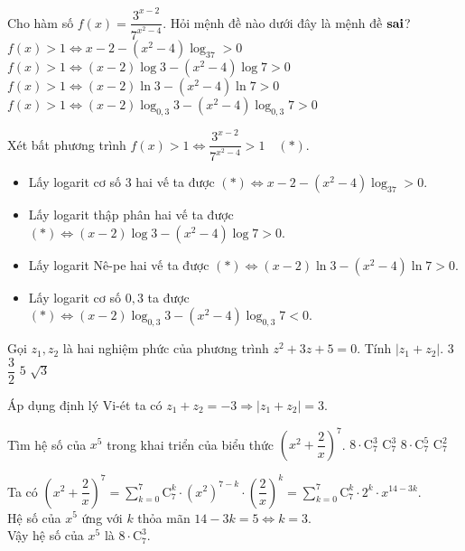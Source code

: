 \begin{ex}%
	Cho hàm số $f(x)=\dfrac{3^{x-2}}{7^{x^2-4}}$. Hỏi mệnh đề nào dưới đây là mệnh đề $\bf{sai}$?
	\choice
	{$f(x)>1 \Leftrightarrow x-2 -(x^2-4) \log_37>0$}
	{$f(x)>1 \Leftrightarrow (x-2)\log3-(x^2-4)\log7 >0$}
	{$f(x)>1 \Leftrightarrow (x-2)\ln 3 -(x^2-4)\ln 7 >0$}
	{\True $f(x)>1 \Leftrightarrow (x-2)\log_{0{,}3}3-(x^2-4)\log_{0{,}3}7>0$}
	\loigiai
	{ Xét bất phương trình $f(x)>1 \Leftrightarrow \dfrac{3^{x-2}}{7^{x^2-4}}>1 \quad (*).$ 
	\begin{itemize}
		\item  Lấy logarit cơ số 3 hai vế ta được  $ (*) \Leftrightarrow x-2 -(x^2-4) \log_37>0.$
		\item Lấy logarit thập phân hai vế ta được $(*) \Leftrightarrow (x-2)\log3-(x^2-4)\log7 >0$.
		\item Lấy logarit Nê-pe hai vế ta được $(*) \Leftrightarrow (x-2)\ln 3 -(x^2-4)\ln 7 >0$.
		\item  Lấy logarit cơ số $0{,}3$ ta được $(*) \Leftrightarrow (x-2)\log_{0{,}3}3-(x^2-4)\log_{0{,}3}7<0 $.
	\end{itemize}
		
	}
\end{ex}

\begin{ex}%
	Gọi $z_1, z_2$ là hai nghiệm phức của phương trình $z^2+3z+5=0$. Tính $|z_1+z_2|$.
	\choice
	{\True $ 3$}
	{$\dfrac{3}{2}$}
	{$5$}
	{$\sqrt{3}$}
	\loigiai
	{ Áp dụng định lý Vi-ét ta có $z_1+z_2=-3 \Rightarrow |z_1+z_2|=3.$
		
	}
	
\end{ex}

\begin{ex}%
	Tìm hệ số của $x^5$ trong khai triển của biểu thức $\left( x^2+\dfrac{2}{x}\right)^7$.
	\choice
	{\True $8 \cdot \mathrm{C}_7^3$}
	{$\mathrm{C}_7^3$}
	{$8 \cdot \mathrm{C}_7^5$}
	{$\mathrm{C}_7^2$}
	\loigiai
	{ Ta có  $\left( x^2+\dfrac{2}{x}\right)^7= \sum\limits_{k=0}^{7} \mathrm{C}_7^k \cdot \left( x^2\right)^{7-k} \cdot \left( \dfrac{2}{x}\right)^k = \sum\limits_{k=0}^7\mathrm{C}_7^k \cdot 2^k \cdot x^{14-3k}.$ \\
		Hệ số của $x^5$ ứng với $k$ thỏa mãn $14-3k=5 \Leftrightarrow k=3$.\\
		Vậy hệ số của $x^5$ là $8\cdot \mathrm{C}_7^3$.
		
	}
\end{ex}


